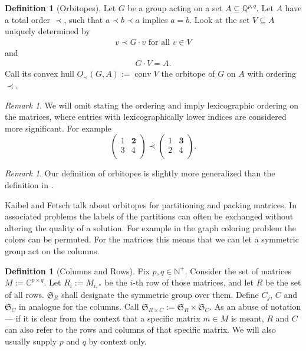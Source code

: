 \documentclass[a4paper]{amsart}
\theoremstyle{definition}
\newtheorem{defn}[theorem]{Definition}
\theoremstyle{remark}
\newtheorem{remark}[theorem]{Remark}
\DeclareMathOperator{\conv}{conv}
\newcommand{\lex}{\ensuremath{\prec}} %
\newcommand{\lr}[1]{\ensuremath{\left( #1 \right)}}
\newcommand{\naturals}{\ensuremath{\mathbb{N}}}
\newcommand{\rationals}{\ensuremath{\mathbb{Q}}}
\newcommand{\Sym}{\ensuremath{\mathfrak{S}}}
\begin{document}
 \begin{defn}[Orbitopes]
   Let \(G\) be a group acting on a set \(A \subseteq \rationals^{p,q}\).  Let \(A\) have a total order \(\lex\), such that \(a\lex b \lex a\) implies \(a = b\).
   Look at the set \(V \subseteq A\) uniquely determined by
   \begin{align}
       v  \lex  G \cdot v  \text{ for all } v \in V
     \end{align}
   and
   \begin{align}
     G \cdot V =  A \text{.}
   \end{align}
   Call its convex hull \(O_{\lex} \lr{G, A} := \conv{}  V\) the orbitope of
   \(G\) on \(A\) with ordering \(\lex\).  
 \end{defn}
\begin{remark}
  We will omit stating the ordering and imply lexicographic ordering
  on the matrices, where entries with lexicographically lower indices
  are considered more significant.  For example
  \[\lr{\begin{matrix}
      1 & \mathbf{2} \\
      3 & 4 \\
      \end{matrix}
    }
    \lex
    \lr{\begin{matrix}
      1 & \mathbf{3} \\
      2 & 4 \\
      \end{matrix}
    }\text{.}
  \]
\end{remark}
\begin{remark}
  Our definition of orbitopes is slightly more generalized than the definition in \cite{orbi}.
\end{remark}

Kaibel and Fetsch talk about orbitopes for partitioning and packing
matrices.  In associated problems the labels of the partitions can
often be exchanged without altering the quality of a solution.  For
example in the graph coloring problem the colors can be permuted.  For
the matrices this means that we can let a symmetric group act on the
columns.

\begin{defn}[Columns and Rows]
  Fix \(p, q \in \naturals^+\).  Consider the set of matrices \(M :=
  \mathbb{C}^{p \times q}\).  Let \(R_i := M_{i, *}\) be the \(i\)-th
  row of those matrices, and let \(R\) be the set of all rows.
  \(\Sym_R\) shall designate the symmetric group over them.  Define
  \(C_j\), \(C\) and \(\Sym_C\) in analogue for the columns.  Call
  \(\Sym_{R \times C} := \Sym_R \times \Sym_C\).  As an abuse of
  notation --- if it is clear from the context that a specific matrix
  \(m \in M\) is meant, \(R\) and \(C\) can also refer to the rows
  and columns of that specific matrix.  We will also usually supply \(p\)
  and \(q\) by context only.
\end{defn}
\end{document}
